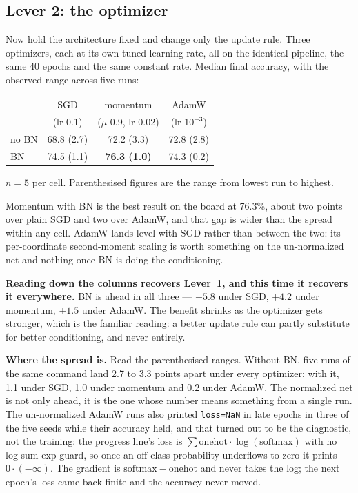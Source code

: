 \subsection*{Lever 2: the optimizer}

Now hold the architecture fixed and change only the update rule. Three
optimizers, each at its own tuned learning rate, all on the identical
pipeline, the same 40 epochs and the same constant rate. Median final
accuracy, with the observed range across five runs:

\begin{center}
\begin{tabular}{l c c c}
\hline
       & SGD & momentum & AdamW \\
       & (lr 0.1) & ($\mu$ 0.9, lr 0.02) & (lr $10^{-3}$) \\
\hline
no BN  & 68.8 {\footnotesize (2.7)} & 72.2 {\footnotesize (3.3)} & 72.8 {\footnotesize (2.8)} \\
BN     & 74.5 {\footnotesize (1.1)} & \textbf{76.3 {\footnotesize (1.0)}} & 74.3 {\footnotesize (0.2)} \\
\hline
\end{tabular}
\end{center}

\noindent $n=5$ per cell. Parenthesised figures are the range from lowest
run to highest.

\medskip\noindent Momentum with BN is the best result on the board at
76.3\%, about two points over plain SGD and two over AdamW,
and that gap is wider than the spread within any cell. AdamW lands
level with SGD rather than between the two: its per-coordinate
second-moment scaling is worth something on the un-normalized net and
nothing once BN is doing the conditioning.

\medskip\noindent\textbf{Reading down the columns recovers Lever~1, and
this time it recovers it everywhere.} BN is ahead in all three ---
$+5.8$ under SGD, $+4.2$ under momentum,
$+1.5$ under AdamW. The benefit shrinks as the optimizer gets
stronger, which is the familiar reading: a better update rule can
partly substitute for better conditioning, and never entirely.

\medskip\noindent\textbf{Where the spread is.} Read the parenthesised
ranges. Without BN, five runs of the same command land 2.7 to 3.3 points
apart under every optimizer; with it, 1.1 under SGD, 1.0 under momentum
and 0.2 under AdamW. The normalized net is not only ahead, it is the one
whose number means something from a single run. The un-normalized AdamW
runs also printed \texttt{loss=NaN} in late epochs in three of the five
seeds while their accuracy held, and that turned out to be the
diagnostic, not the training: the progress line's loss is
$\sum \mathrm{onehot}\cdot\log(\mathrm{softmax})$ with no log-sum-exp
guard, so once an off-class probability underflows to zero it prints
$0\cdot(-\infty)$. The gradient is $\mathrm{softmax}-\mathrm{onehot}$
and never takes the log; the next epoch's loss came back finite and the
accuracy never moved.

